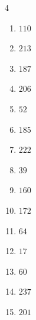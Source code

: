 \begin{multicols}{4}
\begin{enumerate}

  \item $110$


  \item $213$


  \item $187$


  \item $206$


  \item $52$


  \item $185$


  \item $222$


\columnbreak %

\resetques

  \item $39$


  \item $160$


  \item $172$


  \item $64$


  \item $17$


  \item $60$


  \item $237$


  \item $201$


\end{enumerate}
\end{multicols}
